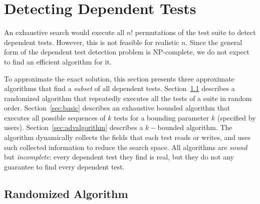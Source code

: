 \section{Detecting Dependent Tests}
\label{sec:detecting}

\newcommand{\smalltrialnum}{10\xspace}
\newcommand{\mediumtrialnum}{100\xspace}
\newcommand{\trialnum}{1000\xspace}

\newcommand{\testlist}[0]{\ensuremath{T^k_i}}
\newcommand{\executeTestsInOrder}[1]{\result{#1}{\env_0}}

An exhaustive search would execute all $n!$
permutations of the test suite to detect dependent tests.
However, this is not feasible for realistic $n$.
Since the general form of the dependent test detection problem is
NP-complete, we do not expect to find an efficient algorithm for it.

To approximate the exact solution, this section
presents three approximate algorithms that find a \textit{subset} of
all dependent tests.
Section~\ref{sec:randomized} describes a randomized algorithm
that repeatedly executes all the tests of a suite in random order.
Section~\ref{sec:basic} describes an exhaustive bounded algorithm that
executes all possible sequences of $k$ tests for a bounding parameter $k$
(specified by users).
Section~\ref{sec:advalgorithm} describes a \dependenceaware{} $k-$bounded algorithm.
The \dependenceaware{} algorithm dynamically collects the fields that each test
reads or writes, and uses such collected information to reduce the search space.
All algorithms are \textit{sound} but \textit{incomplete}:
every dependent test they find is real, but they do not
any guarantee to find every dependent test.

\subsection{Randomized Algorithm}
\label{sec:randomized}

